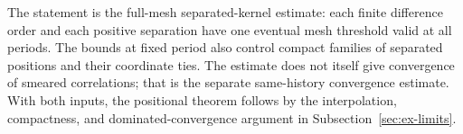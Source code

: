 \begin{remark}
The statement is the full-mesh separated-kernel estimate: each finite difference
order and each positive separation have one eventual mesh threshold valid at
all periods. The bounds at fixed period also control compact families of
separated positions and their coordinate ties. The estimate does not itself
give convergence of smeared correlations; that is the separate
same-history convergence estimate. With both inputs, the positional theorem
follows by the interpolation, compactness, and dominated-convergence argument
in Subsection~\ref{sec:ex-limits}.
\end{remark}
